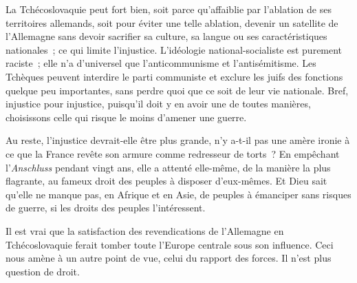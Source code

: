 \documentclass[french,twoside]{book} %
\begin{document}
La Tchécoslovaquie peut fort bien, soit parce qu'affaiblie par l'ablation de ses territoires allemands, soit pour éviter une telle ablation, devenir un satellite de l'Allemagne sans devoir sacrifier sa culture, sa langue ou ses caractéris­tiques nationales ; ce qui limite l'injustice. L'idéologie national-socialiste est purement raciste ; elle n'a d'universel que l'anticommunisme et l'antisémi­tisme. Les Tchèques peuvent interdire le parti communiste et exclure les juifs des fonctions quelque peu importantes, sans perdre quoi que ce soit de leur vie nationale. Bref, injustice pour injustice, puisqu'il doit y en avoir une de toutes manières, choisissons celle qui risque le moins d'amener une guerre.\par
Au reste, l'injustice devrait-elle être plus grande, n'y a-t-il pas une amère ironie à ce que la France revête son armure comme redresseur de torts ? En empêchant l'{\itshape Anschluss} pendant vingt ans, elle a attenté elle-même, de la manière la plus flagrante, au fameux droit des peuples à disposer d'eux-mê­mes. Et Dieu sait qu'elle ne manque pas, en Afrique et en Asie, de peuples à émanciper sans risques de guerre, si les droits des peuples l'intéressent.\par
Il est vrai que la satisfaction des revendications de l'Allemagne en Tchécoslovaquie ferait tomber toute l'Europe centrale sous son influence. Ceci nous amène à un autre point de vue, celui du rapport des forces. Il n'est plus question de droit.\par
\par
\end{document}
